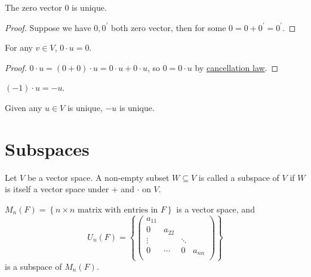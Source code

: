 \begin{theorem}\label{thm: zero unique}
    The zero vector \(0\) is unique. 
\end{theorem}
\begin{proof}
    Suppose we have \(0, 0^{\prime} \) both zero vector, then for some \(0 = 0 + 0^{\prime} = 0^{\prime} \).  
\end{proof}

\begin{theorem} \label{thm: 0u=0}
For any \(v \in V\), \(0 \cdot u = 0\). 
\end{theorem}
\begin{proof}
    \(0 \cdot u = (0 + 0) \cdot u = 0 \cdot u + 0 \cdot u\), so \(0 = 0 \cdot u\) by \hyperref[thm: Cancellation Law]{cancellation law}.   
\end{proof}

\begin{theorem} \label{thm: (-1)u=-u}
    \((-1) \cdot u = -u\). 
\end{theorem}

\begin{theorem} \label{thm: addition inverse unique}
    Given any \(u \in V\) is unique, \(-u\) is unique.  
\end{theorem}

\section{Subspaces}
\begin{definition}[subspace] \label{def: subspace}
    Let \(V\) be a vector space. A non-empty subset \(W \subseteq V\) is called a subspace of \(V\) if \(W\) is itself a vector space under \(+\) and \(\cdot\) on \(V\).       
\end{definition}

\begin{eg}
    \(M_n(F) = \left\{ n \times n \text{ matrix with entries in } F \right\} \) is a vector space, and 
    \[
        U_n(F) = \left\{ \begin{pmatrix}
            a_{11}  &  &  &   \\
            0 & a_{22}  &  &   \\
            \vdots &  & \ddots &   \\
            0 & \cdots & 0 & a_{nn}  \\
        \end{pmatrix} \right\} 
    \] is a subspace of \(M_n(F)\). 
\end{eg}

